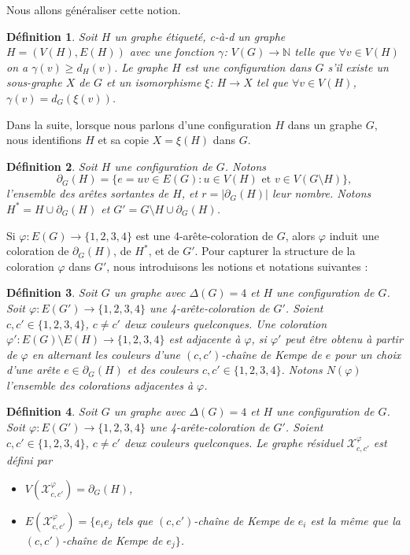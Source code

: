 \documentclass[10pt,a4paper]{article}
\newtheorem{definition}{Définition}
\begin{document}
Nous allons généraliser cette notion.

\begin{definition}
Soit $H$ un graphe étiqueté, c-à-d un graphe $H= (V(H), E(H))$ avec une fonction $\gamma$: $V(G) \to \mathbb{N}$ telle que $\forall v \in V(H)$ on a $\gamma(v) \geq d_H(v)$. Le graphe $H$ est une \emph{configuration} dans $G$ s'il existe un sous-graphe $X$ de $G$ et un isomorphisme $\xi$: $H \to X$ tel que $\forall v \in V(H)$, $\gamma(v) = d_G(\xi(v))$. 
\label{de:conf}
\end{definition}

Dans la suite, lorsque nous parlons d'une configuration $H$ dans un graphe $G$, nous identifions $H$ et sa copie $X=\xi(H)$ dans $G$.

\begin{definition}
Soit $H$ une configuration de $G$. Notons
$$
\partial_G(H) = \{e =uv \in E(G) : u \in V(H)\textrm{ et }v \in V(G \setminus H)\},
$$ l'ensemble des arêtes sortantes de $H$, et $r=|\partial_G(H)|$ leur nombre.
Notons $H^* = H \cup \partial_G(H)$ et $G'=G\setminus H \cup \partial_G(H)$.
\label{de:ring}
\end{definition}

Si $\varphi:E(G)\to \{1,2,3,4\}$ est une 4-arête-coloration de $G$, alors $\varphi$ induit une coloration de $\partial_G(H)$, de $H^*$, et de $G'$. Pour capturer la structure de la coloration $\varphi$ dans $G'$, nous introduisons les notions et notations suivantes :

\begin{definition}
Soit $G$ un graphe avec $\Delta(G)=4$ et $H$ une configuration de $G$.
Soit $\varphi:E(G')\to \{1,2,3,4\}$ une 4-arête-coloration de $G'$. 
Soient $c, c' \in \{1,2,3,4\}$, $c\ne c'$ deux couleurs quelconques. 
Une coloration $\varphi':E(G)\setminus E(H)\to \{1,2,3,4\}$ est \emph{adjacente} à $\varphi$, si $\varphi'$ peut être obtenu à partir de $\varphi$ en alternant les couleurs d'une $(c,c')$-chaîne de Kempe de $e$ pour un choix d'une arête $e\in\partial_G(H)$ et des couleurs $c,c'\in\{1,2,3,4\}$. Notons $N(\varphi)$ l'ensemble des colorations adjacentes à $\varphi$.
\end{definition}

\begin{definition}
Soit $G$ un graphe avec $\Delta(G)=4$ et $H$ une configuration de $G$.
Soit $\varphi:E(G')\to \{1,2,3,4\}$ une 4-arête-coloration de $G'$. 
Soient $c, c' \in \{1,2,3,4\}$, $c\ne c'$ deux couleurs quelconques. 
Le \emph{graphe résiduel}
$\mathcal{X}^{\varphi}_{c,c'}$ est défini par
\begin{itemize}
\item $V(\mathcal{X}^{\varphi}_{c,c'}) = \partial_G(H)$, 
\item $E(\mathcal{X}^{\varphi}_{c,c'}) = \{ e_ie_j$ tels que $(c,c')$-chaîne de Kempe de $e_i$ est la même que la $(c,c')$-chaîne de Kempe de $e_j\}$.
\end{itemize}
\end{definition}
\end{document}
